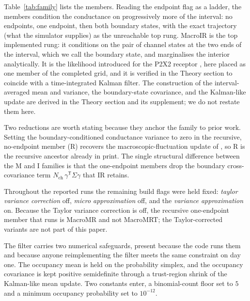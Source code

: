 Table~\ref{tab:family} lists the members. Reading the endpoint flag as a ladder,
the members condition the conductance on progressively more of the interval: no
endpoints, one endpoint, then both boundary states, with the exact trajectory (what
the simulator supplies) as the unreachable top rung.
MacroIR is the top implemented rung: it conditions on the pair of channel states at
the two ends of the interval, which we call the boundary state, and marginalises the
interior analytically. It is the likelihood introduced for the P2X2 receptor
\citep{moffatt2025bayesian}, here placed as one member of the completed grid, and it
is verified in the Theory section to coincide with a time-integrated Kalman filter.
The construction of the interval-averaged mean and variance, the boundary-state
covariance, and the Kalman-like update are derived in the Theory section and its
supplement; we do not restate them here.

Two reductions are worth stating because they anchor the family to prior work.
Setting the boundary-conditioned conductance variance to zero in the recursive,
no-endpoint member (R) recovers the macroscopic-fluctuation update of
\citet{moffatt2007estimation}, so R is the recursive ancestor already in print.
The single structural difference between the M and I families is that the
one-endpoint members drop the boundary cross-covariance term
$N_{\mathrm{ch}}\,\gamma^{\mathsf T}\!\Sigma\gamma$ that IR retains.

Throughout the reported runs the remaining build flags were held fixed:
\emph{taylor variance correction} off, \emph{micro approximation} off, and the
\emph{variance approximation} on.
Because the Taylor variance correction is off, the recursive one-endpoint member
that runs is MacroMR and not MacroMRT; the Taylor-corrected variants are not part
of this paper.

The filter carries two numerical safeguards, present because the code runs them and
because anyone reimplementing the filter meets the same constraint on day one. The
occupancy mean is held on the probability simplex, and the occupancy covariance is
kept positive semidefinite through a trust-region shrink of the Kalman-like mean
update. Two constants enter, a binomial-count floor set to $5$ and a minimum
occupancy probability set to $10^{-12}$.

